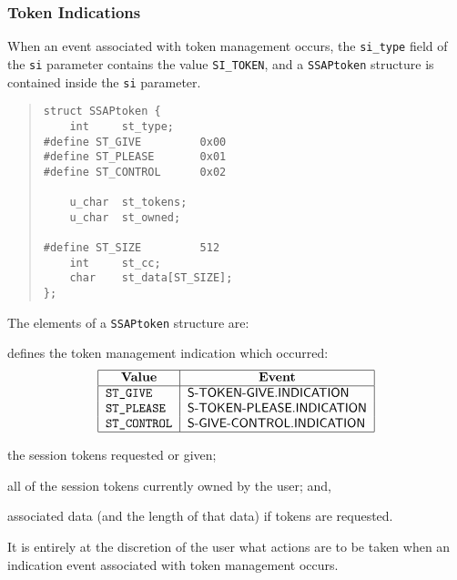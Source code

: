 \subsubsection	{Token Indications}
When an event associated with token management occurs,
the \verb"si_type" field of the \verb"si" parameter contains the value
\verb"SI_TOKEN",
and a \verb"SSAPtoken" structure is contained inside the \verb"si" parameter.
\begin{quote}\small\begin{verbatim}
struct SSAPtoken {
    int     st_type;
#define ST_GIVE         0x00
#define ST_PLEASE       0x01
#define ST_CONTROL      0x02

    u_char  st_tokens;
    u_char  st_owned;

#define ST_SIZE         512
    int     st_cc;
    char    st_data[ST_SIZE];
};
\end{verbatim}\end{quote}
The elements of a \verb"SSAPtoken" structure are:
\begin{describe}
\item[\verb"st\_type":] defines the token management indication which
occurred:
\[\begin{tabular}{|l|l|}
\hline
    \multicolumn{1}{|c|}{\bf Value}&
		\multicolumn{1}{c|}{\bf Event}\\
\hline
    \tt ST\_GIVE&	\sf S-TOKEN-GIVE.INDICATION\\
    \tt ST\_PLEASE&	\sf S-TOKEN-PLEASE.INDICATION\\
    \tt ST\_CONTROL&	\sf S-GIVE-CONTROL.INDICATION\\
\hline
\end{tabular}\]

\item[\verb"st\_tokens":] the session tokens requested or given;

\item[\verb"st\_owned":] all of the session tokens currently owned by the
user;
and,

\item[\verb"st\_base"/\verb"st\_cc":]
associated data (and the length of that data) if tokens are requested.
\end{describe}
It is entirely at the discretion of the user what actions are to be taken when
an indication event associated with token management occurs.

